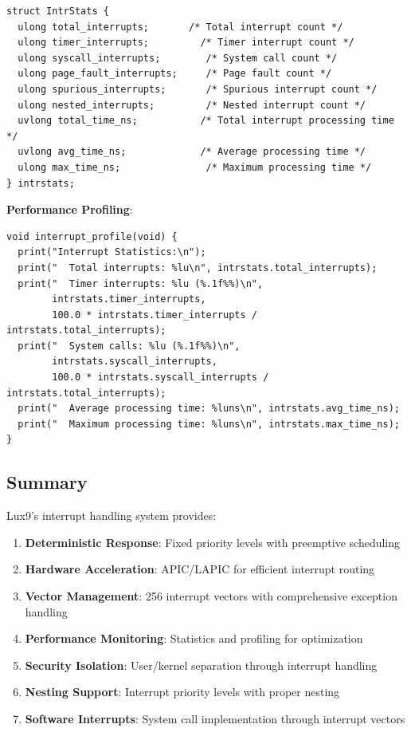 \documentclass[11pt,letterpaper]{article}
\begin{document}
\begin{lstlisting}
struct IntrStats {
  ulong total_interrupts;       /* Total interrupt count */
  ulong timer_interrupts;         /* Timer interrupt count */
  ulong syscall_interrupts;        /* System call count */
  ulong page_fault_interrupts;     /* Page fault count */
  ulong spurious_interrupts;       /* Spurious interrupt count */
  ulong nested_interrupts;         /* Nested interrupt count */
  uvlong total_time_ns;           /* Total interrupt processing time */
  uvlong avg_time_ns;             /* Average processing time */
  ulong max_time_ns;               /* Maximum processing time */
} intrstats;
\end{lstlisting}

\textbf{Performance Profiling}:

\begin{lstlisting}
void interrupt_profile(void) {
  print("Interrupt Statistics:\n");
  print("  Total interrupts: %lu\n", intrstats.total_interrupts);
  print("  Timer interrupts: %lu (%.1f%%)\n", 
        intrstats.timer_interrupts,
        100.0 * intrstats.timer_interrupts / intrstats.total_interrupts);
  print("  System calls: %lu (%.1f%%)\n",
        intrstats.syscall_interrupts,
        100.0 * intrstats.syscall_interrupts / intrstats.total_interrupts);
  print("  Average processing time: %luns\n", intrstats.avg_time_ns);
  print("  Maximum processing time: %luns\n", intrstats.max_time_ns);
}
\end{lstlisting}

\subsection{Summary}

Lux9's interrupt handling system provides:

\begin{enumerate}
\item \textbf{Deterministic Response}: Fixed priority levels with preemptive scheduling
\item \textbf{Hardware Acceleration}: APIC/LAPIC for efficient interrupt routing
\item \textbf{Vector Management}: 256 interrupt vectors with comprehensive exception handling
\item \textbf{Performance Monitoring}: Statistics and profiling for optimization
\item \textbf{Security Isolation}: User/kernel separation through interrupt handling
\item \textbf{Nesting Support}: Interrupt priority levels with proper nesting
\item \textbf{Software Interrupts}: System call implementation through interrupt vectors
\end{enumerate}
\end{document}
